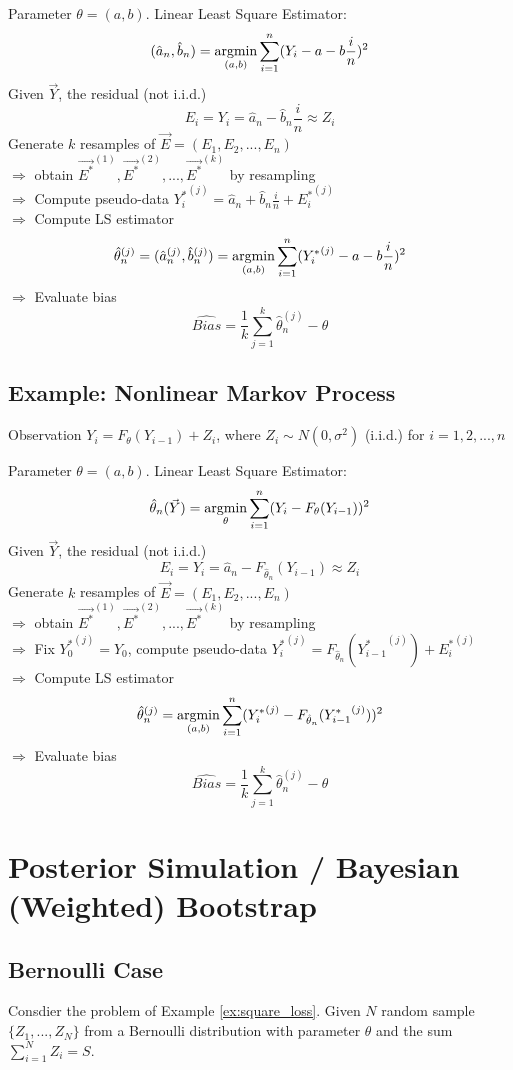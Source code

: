 \documentclass[11pt]{elegantbook}
\newcommand{\argmin}{\operatornamewithlimits{argmin}}
\begin{document}
Parameter $\theta=(a,b)$. Linear Least Square Estimator:
$$(\hat{a}_n,\hat{b}_n)=\argmin_{(a,b)}\sum_{i=1}^n(Y_i-a-b\frac{i}{n})^2$$
Given $\vec{Y}$, the residual (not i.i.d.)$$E_i=Y_i=\hat{a}_n-\hat{b}_n\frac{i}{n}\approx Z_i$$
Generate $k$ resamples of $\vec{E}=(E_1,E_2,...,E_n)$\\
$\Rightarrow$ obtain $\vec{E^*}^{(1)},\vec{E^*}^{(2)},...,\vec{E^*}^{(k)}$ by resampling\\
$\Rightarrow$ Compute pseudo-data ${Y_i^*}^{(j)}=\hat{a}_n+\hat{b}_n\frac{i}{n}+{E_i^*}^{(j)}$\\
$\Rightarrow$ Compute LS estimator $$\hat{\theta}_n^{(j)}=(\hat{a}_n^{(j)},\hat{b}_n^{(j)})=\argmin_{(a,b)}\sum_{i=1}^n({Y_i^*}^{(j)}-a-b\frac{i}{n})^2$$
$\Rightarrow$ Evaluate bias $$\widehat{Bias}=\frac{1}{k}\sum_{j=1}^k \hat{\theta}_n^{(j)}-\theta$$

\subsection*{Example: Nonlinear Markov Process}
Observation $Y_i=F_{\theta}(Y_{i-1})+Z_i$, where $Z_i\sim N(0,\sigma^2)$ (i.i.d.) for $i=1,2,...,n$

Parameter $\theta=(a,b)$. Linear Least Square Estimator:
$$\hat{\theta}_n(\vec{Y})=\argmin_{\theta}\sum_{i=1}^n(Y_i-F_{\theta}(Y_{i-1}))^2$$
Given $\vec{Y}$, the residual (not i.i.d.)$$E_i=Y_i=\hat{a}_n-F_{\hat{\theta}_n}(Y_{i-1})\approx Z_i$$
Generate $k$ resamples of $\vec{E}=(E_1,E_2,...,E_n)$\\
$\Rightarrow$ obtain $\vec{E^*}^{(1)},\vec{E^*}^{(2)},...,\vec{E^*}^{(k)}$ by resampling\\
$\Rightarrow$ Fix ${Y_0^*}^{(j)}=Y_0$, compute pseudo-data ${Y_i^*}^{(j)}=F_{\hat{\theta}_n}({Y^*_{i-1}}^{(j)})+{E_i^*}^{(j)}$\\
$\Rightarrow$ Compute LS estimator $$\hat{\theta}_n^{(j)}=\argmin_{(a,b)}\sum_{i=1}^n({Y_i^*}^{(j)}-F_{\hat{\theta}_n}({Y^*_{i-1}}^{(j)}))^2$$
$\Rightarrow$ Evaluate bias $$\widehat{Bias}=\frac{1}{k}\sum_{j=1}^k \hat{\theta}_n^{(j)}-\theta$$


\section{Posterior Simulation / Bayesian (Weighted) Bootstrap}
\subsection{Bernoulli Case}
Consdier the problem of Example \ref{ex:square_loss}. Given $N$ random sample $\{Z_1,...,Z_N\}$ from a Bernoulli distribution with parameter $\theta$ and the sum $\sum_{i=1}^N Z_i=S$.
\end{document}
